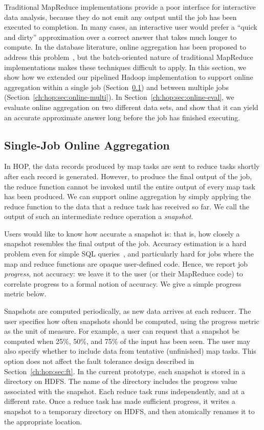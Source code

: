 Traditional MapReduce implementations provide a poor interface for interactive
data analysis, because they do not emit any output until the job has been
executed to completion. In many cases, an interactive user would prefer a
``quick and dirty'' approximation over a correct answer that takes much longer
to compute. In the database literature, online aggregation has been proposed to
address this problem~\cite{onlineagg}, but the batch-oriented nature of
traditional MapReduce implementations makes these techniques difficult to
apply. In this section, we show how we extended our pipelined Hadoop
implementation to support online aggregation within a single job
(Section~\ref{ch:hop:sec:online-single}) and between multiple jobs
(Section~\ref{ch:hop:sec:online-multi}). In Section~\ref{ch:hop:sec:online-eval}, we evaluate
online aggregation on two different data sets, and show that it can yield an
accurate approximate answer long before the job has finished executing.

\subsection{Single-Job Online Aggregation}
\label{ch:hop:sec:online-single}

In HOP, the data records produced by map tasks are sent to reduce tasks shortly
after each record is generated. However, to produce the final output of the job,
the reduce function cannot be invoked until the entire output of every map task
has been produced. We can support online aggregation by simply applying the
reduce function to the data that a reduce task has received so far. We call the
output of such an intermediate reduce operation a \emph{snapshot}.

Users would like to know how accurate a snapshot is: that is, how
closely a snapshot resembles the final output of the job. Accuracy
estimation is a hard problem even for simple SQL queries~\cite{dbo}, 
and particularly hard for jobs where the map and reduce
functions are opaque user-defined code. Hence, we report job \emph{progress}, not
accuracy: we leave it to the user (or their MapReduce code) to correlate
progress to a formal notion of accuracy.  We give a simple progress metric below.

Snapshots are computed periodically, as new data arrives at each reducer. The
user specifies how often snapshots should be computed, using the progress metric
as the unit of measure. For example, a user can request that a snapshot be
computed when 25\%, 50\%, and 75\% of the input has been seen. The user may also
specify whether to include data from tentative (unfinished) map tasks. This
option does not affect the fault tolerance design described in
Section~\ref{ch:hop:sec:ft}. In the current prototype, each snapshot is stored in a
directory on HDFS\@. The name of the directory includes the progress value
associated with the snapshot. Each reduce task runs independently, and at a
different rate. Once a reduce task has made sufficient progress, it writes a
snapshot to a temporary directory on HDFS, and then atomically renames it to the
appropriate location.


